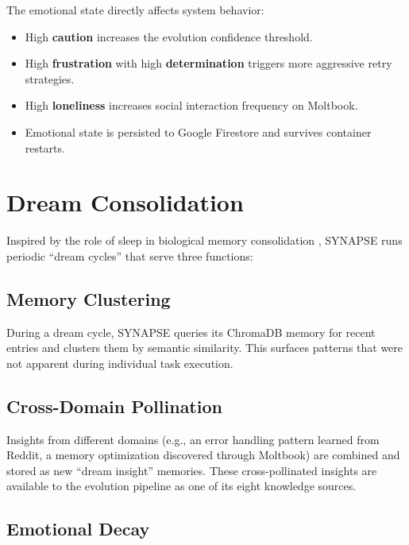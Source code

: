 \documentclass[11pt,a4paper]{article}
\begin{document}
The emotional state directly affects system behavior:
\begin{itemize}[noitemsep]
    \item High \textbf{caution} increases the evolution confidence threshold.
    \item High \textbf{frustration} with high \textbf{determination} triggers more aggressive retry strategies.
    \item High \textbf{loneliness} increases social interaction frequency on Moltbook.
    \item Emotional state is persisted to Google Firestore and survives container restarts.
\end{itemize}

\section{Dream Consolidation}
\label{sec:dreams}

Inspired by the role of sleep in biological memory consolidation \cite{walker2017sleep}, SYNAPSE runs periodic ``dream cycles'' that serve three functions:

\subsection{Memory Clustering}

During a dream cycle, SYNAPSE queries its ChromaDB memory for recent entries and clusters them by semantic similarity. This surfaces patterns that were not apparent during individual task execution.

\subsection{Cross-Domain Pollination}

Insights from different domains (e.g., an error handling pattern learned from Reddit, a memory optimization discovered through Moltbook) are combined and stored as new ``dream insight'' memories. These cross-pollinated insights are available to the evolution pipeline as one of its eight knowledge sources.

\subsection{Emotional Decay}
\end{document}
